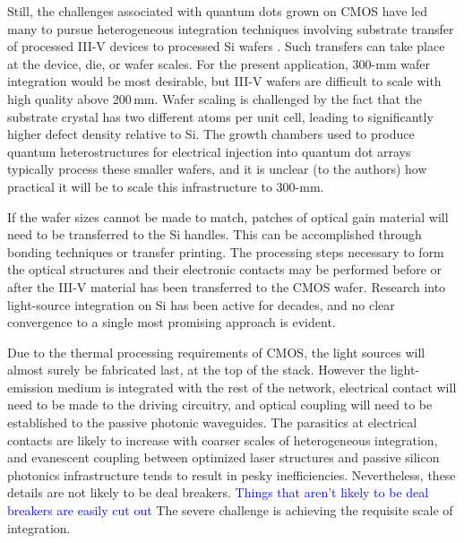\documentclass[twocolumn]{article}
\begin{document}
Still, the challenges associated with quantum dots grown on CMOS have led many to pursue heterogeneous integration techniques involving substrate transfer of processed III-V devices to processed Si wafers \cite{}. Such transfers can take place at the device, die, or wafer scales. For the present application, 300-mm wafer integration would be most desirable, but III-V wafers are difficult to scale with high quality above 200\,mm. Wafer scaling is challenged by the fact that the substrate crystal has two different atoms per unit cell, leading to significantly higher defect density relative to Si. The growth chambers used to produce quantum heterostructures for electrical injection into quantum dot arrays typically process these smaller wafers, and it is unclear (to the authors) how practical it will be to scale this infrastructure to 300-mm. 

If the wafer sizes cannot be made to match, patches of optical gain material will need to be transferred to the Si handles. This can be accomplished through bonding techniques or transfer printing. The processing steps necessary to form the optical structures and their electronic contacts may be performed before or after the III-V material has been transferred to the CMOS wafer. Research into light-source integration on Si has been active for decades, and no clear convergence to a single most promising approach is evident.

Due to the thermal processing requirements of CMOS, the light sources will almost surely be fabricated last, at the top of the stack. However the light-emission medium is integrated with the rest of the network, electrical contact will need to be made to the driving circuitry, and optical coupling will need to be established to the passive photonic waveguides. The parasitics at electrical contacts are likely to increase with coarser scales of heterogeneous integration, and evanescent coupling between optimized laser structures and passive silicon photonics infrastructure tends to result in pesky inefficiencies. Nevertheless, these details are not likely to be deal breakers. \textcolor{blue}{Things that aren't likely to be deal breakers are easily cut out} The severe challenge is achieving the requisite scale of integration.
\end{document}
